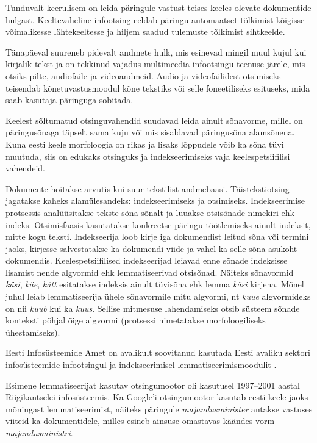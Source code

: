 \begin{multicols}{2}

Tunduvalt keerulisem on leida päringule vastust teises keeles olevate dokumentide hulgast. 
Keeltevaheline infootsing eeldab päringu automaatset tõlkimist kõigisse võimalikesse lähtekeeltesse ja hiljem saadud tulemuste tõlkimist sihtkeelde. 

Tänapäeval suureneb pidevalt andmete hulk, mis esinevad mingil muul kujul kui kirjalik tekst ja on tekkinud vajadus multimeedia infootsingu teenuse järele, mis otsiks pilte, audiofaile ja videoandmeid. 
Audio-ja videofailidest otsimiseks teisendab kõnetuvastusmoodul kõne tekstiks või selle foneetiliseks esituseks, mida saab kasutaja päringuga sobitada. 

Keelest sõltumatud otsinguvahendid suudavad leida ainult sõnavorme, millel on päringusõnaga täpselt sama kuju või mis sisaldavad päringusõna alamsõnena. 
Kuna eesti keele morfoloogia on rikas ja lisaks lõppudele võib ka sõna tüvi muutuda, siis on edukaks otsinguks ja indekseerimiseks vaja keelespetsiifilisi vahendeid. 

Dokumente hoitakse arvutis kui suur tekstilist andmebaasi. 
Täistekstiotsing jagatakse kaheks alamülesandeks: indekseerimiseks ja otsimiseks. 
Indekseerimise protsessis analüüsitakse tekste sõna-sõnalt ja luuakse otsisõnade nimekiri ehk indeks. 
Otsimisfaasis kasutatakse konkreetse päringu töötlemiseks ainult indeksit, mitte kogu teksti. 
Indekseerija loob kirje iga dokumendist leitud sõna või termini jaoks, kirjesse salvestatakse ka dokumendi viide ja vahel ka selle sõna asukoht dokumendis.
Keelespetsiifilised indekseerijad leiavad enne sõnade indeksisse lisamist nende algvormid ehk lemmatiseerivad otsisõnad. 
Näiteks sõnavormid \textit{käsi}, \textit{käe}, \textit{kätt} esitatakse indeksis ainult tüvisõna ehk lemma \textit{käsi} kirjena. 
Mõnel juhul leiab lemmatiseerija ühele sõnavormile mitu algvormi, nt \textit{kuue} algvormideks on nii \textit{kuub} kui ka \textit{kuus}. 
Sellise mitmesuse lahendamiseks otsib süsteem sõnade konteksti põhjal õige algvormi (protsessi nimetatakse morfoloogiliseks ühestamiseks). 


Eesti Infosüsteemide Amet on avalikult soovitanud kasutada Eesti avaliku sektori infosüsteemide infootsingul ja indeksee\-rimisel lemmatiseerimismoodulit \cite{RIA}.

Esimene lemmatiseerijat kasutav otsingumootor oli kasutusel 1997--2001 aastal Riigi\-kantselei infosüsteemis.
Ka Google’i otsingu\-mootor kasutab eesti keele jaoks mõningast lemmatiseerimist, näiteks päringule \textit{majandusminister} antakse vastuses viiteid ka dokumentidele, milles esineb ainsuse omastavas käändes vorm \textit{majandus\-ministri}.


\end{multicols}
